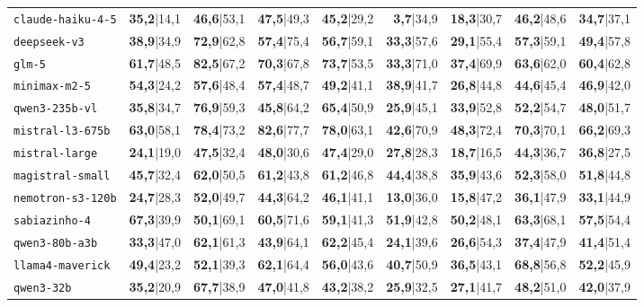 \documentclass{IOS-Book-Article}
\begin{document}
\begin{table}[!ht]
\begin{tabular}{llrrrrrrr}
\texttt{claude-haiku-4-5} & \textbf{35,2}|14,1 & \textbf{46,6}|53,1 & \textbf{47,5}|49,3 & \textbf{45,2}|29,2 & \textbf{3,7}|34,9 & \textbf{18,3}|30,7 & \textbf{46,2}|48,6 & \textbf{34,7}|37,1 \\
\texttt{deepseek-v3} & \textbf{38,9}|34,9 & \textbf{72,9}|62,8 & \textbf{57,4}|75,4 & \textbf{56,7}|59,1 & \textbf{33,3}|57,6 & \textbf{29,1}|55,4 & \textbf{57,3}|59,1 & \textbf{49,4}|57,8 \\
\texttt{glm-5} & \textbf{61,7}|48,5 & \textbf{82,5}|67,2 & \textbf{70,3}|67,8 & \textbf{73,7}|53,5 & \textbf{33,3}|71,0 & \textbf{37,4}|69,9 & \textbf{63,6}|62,0 & \textbf{60,4}|62,8 \\
\texttt{minimax-m2-5} & \textbf{54,3}|24,2 & \textbf{57,6}|48,4 & \textbf{57,4}|48,7 & \textbf{49,2}|41,1 & \textbf{38,9}|41,7 & \textbf{26,8}|44,8 & \textbf{44,6}|45,4 & \textbf{46,9}|42,0 \\
\texttt{qwen3-235b-vl} & \textbf{35,8}|34,7 & \textbf{76,9}|59,3 & \textbf{45,8}|64,2 & \textbf{65,4}|50,9 & \textbf{25,9}|45,1 & \textbf{33,9}|52,8 & \textbf{52,2}|54,7 & \textbf{48,0}|51,7 \\
\texttt{mistral-l3-675b} & \textbf{63,0}|58,1 & \textbf{78,4}|73,2 & \textbf{82,6}|77,7 & \textbf{78,0}|63,1 & \textbf{42,6}|70,9 & \textbf{48,3}|72,4 & \textbf{70,3}|70,1 & \textbf{66,2}|69,3 \\
\texttt{mistral-large} & \textbf{24,1}|19,0 & \textbf{47,5}|32,4 & \textbf{48,0}|30,6 & \textbf{47,4}|29,0 & \textbf{27,8}|28,3 & \textbf{18,7}|16,5 & \textbf{44,3}|36,7 & \textbf{36,8}|27,5 \\
\texttt{magistral-small} & \textbf{45,7}|32,4 & \textbf{62,0}|50,5 & \textbf{61,2}|43,8 & \textbf{61,2}|46,8 & \textbf{44,4}|38,8 & \textbf{35,9}|43,6 & \textbf{52,3}|58,0 & \textbf{51,8}|44,8 \\
\texttt{nemotron-s3-120b} & \textbf{24,7}|28,3 & \textbf{52,0}|49,7 & \textbf{44,3}|64,2 & \textbf{46,1}|41,1 & \textbf{13,0}|36,0 & \textbf{15,8}|47,2 & \textbf{36,1}|47,9 & \textbf{33,1}|44,9 \\
\texttt{sabiazinho-4} & \textbf{67,3}|39,9 & \textbf{50,1}|69,1 & \textbf{60,5}|71,6 & \textbf{59,1}|41,3 & \textbf{51,9}|42,8 & \textbf{50,2}|48,1 & \textbf{63,3}|68,1 & \textbf{57,5}|54,4 \\
\texttt{qwen3-80b-a3b} & \textbf{33,3}|47,0 & \textbf{62,1}|61,3 & \textbf{43,9}|64,1 & \textbf{62,2}|45,4 & \textbf{24,1}|39,6 & \textbf{26,6}|54,3 & \textbf{37,4}|47,9 & \textbf{41,4}|51,4 \\
\texttt{llama4-maverick} & \textbf{49,4}|23,2 & \textbf{52,1}|39,3 & \textbf{62,1}|64,4 & \textbf{56,0}|43,6 & \textbf{40,7}|50,9 & \textbf{36,5}|43,1 & \textbf{68,8}|56,8 & \textbf{52,2}|45,9 \\
\texttt{qwen3-32b} & \textbf{35,2}|20,9 & \textbf{67,7}|38,9 & \textbf{47,0}|41,8 & \textbf{43,2}|38,2 & \textbf{25,9}|32,5 & \textbf{27,1}|41,7 & \textbf{48,2}|51,0 & \textbf{42,0}|37,9 \\
\hline
\end{tabular}
\end{table}
\end{document}
